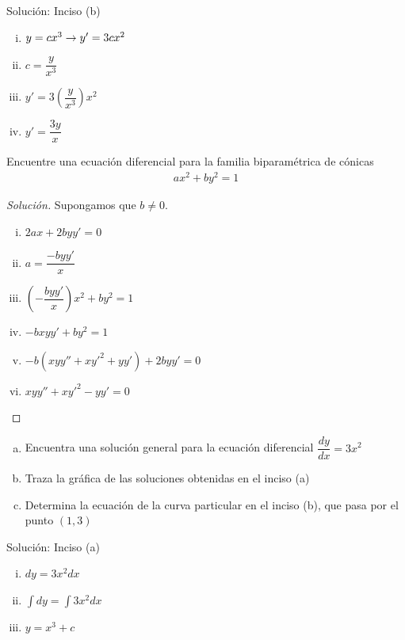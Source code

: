 {Solución: Inciso (b)}
  \begin{enumerate}[(i)]
    \item  $y=cx^3 \rightarrow y'=3cx^{2}$ 
    \item $c=\dfrac{y}{x^3}$ 
    \item $y'=3\left( \dfrac{y}{x^3} \right)x^2$ 
    \item $y'=\dfrac{3y}{x}$
\end{enumerate}

{}
  \begin{problema}

  Encuentre una ecuación diferencial para la familia biparamétrica de cónicas 
         \begin{align}
     ax^{2}+by^{2}=1
     \end{align}

  \end{problema}


{}
      \begin{proof}[Solución]
      
      Supongamos que $b\neq 0$. 
    \begin{enumerate}[(i)] 
      \item $2ax+2byy'=0$ 
      \item $a = \dfrac{-byy'}{x}$ 
      \item $\left( -\dfrac{byy'}{x} \right)x^{2}+by^{2}=1$ 
      \item $-bxyy'+by^{2}=1$ 
      \item $-b\left( xyy''+xy'^{2}+yy' \right)
      +2byy'=0$ 
      \item $xyy''+xy'^{2}-yy'=0$
\end{enumerate}
    \end{proof}

{}
  \begin{enumerate}[(a)]
    \item  Encuentra una solución general para la ecuación diferencial $\dfrac{dy}{dx}=3x^{2}$
    \item Traza la gráfica de las soluciones obtenidas en el inciso (a)
    \item Determina la ecuación de la curva particular en el inciso (b), que pasa por el punto $\left( 1,3 \right)$
\end{enumerate}

{Solución: Inciso (a)}
 \begin{enumerate}[(i)]
   \item $dy=3x^{2}dx$ 
   \item $\displaystyle 
   \int dy = \int 3x^{2}dx$
   
   \item $y=x^{3}+c$
\end{enumerate}


